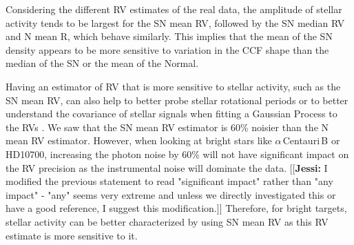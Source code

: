 \documentclass{aa}
\newcommand{\jessi}[1]{{\color{Purple}[[\textbf{Jessi: }#1]]}}
\newcommand{\xavier}[1]{{\color{blue}[[\textbf{Xavier: }#1]]}}
\newcommand{\umberto}[1]{{\color{green}[[\textbf{Umberto: }#1]]}}
\begin{document}
Considering the different RV estimates of the real data, the amplitude of stellar activity tends to be largest for the SN mean RV, followed by the SN median RV and N mean R, which behave similarly. 
This implies that the mean of the SN density appears to be more sensitive to variation in the CCF shape than the median of the SN or the mean of the Normal.  

Having an estimator of RV that is more sensitive to stellar activity, such as the SN mean RV, can also help to better probe stellar rotational periods or to better understand the covariance of stellar signals when fitting a Gaussian Process to the RVs \citep[e.g.][]{Faria-2016a, Haywood-2014}. 
We saw that the SN mean RV estimator is 60\% noisier than the N mean RV estimator. 
However, when looking at bright
stars like $\alpha$\,Centauri\,B or HD10700, increasing the photon noise by 60\% will not have significant impact
on the RV precision as the instrumental noise will dominate the data. 
\jessi{I modified the previous statement to read "significant impact" rather than "any impact" - "any" seems very extreme and unless we directly investigated this or have a good reference, I suggest this modification.}
Therefore, for bright targets, stellar activity 
can be better characterized by using SN mean RV as this RV estimate is more sensitive to it.
%
\end{document}
